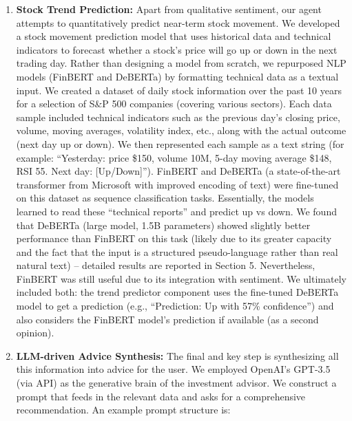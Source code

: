 \documentclass{scrartcl}
\begin{document}
\begin{enumerate}
\noindent
Table~\ref{tab:sentiment_model_comparison} shows a side-by-side comparison of sentiment classifications across individual models and the final ensemble result. This comparison emphasizes how the ensemble strategy corrects edge cases where single models may fail — for example, correctly marking the Amazon expansion as Positive despite FinBERT's Neutral prediction.

This example illustrates several key takeaways:
\begin{itemize}
    \item FinBERT typically excels in domain-specific sentiment.
    \item RoBERTa offers general sentiment understanding but may under- or overestimate tone.
    \item The ensemble aggregates model outputs to yield a balanced and more reliable interpretation.
\end{itemize}

    \item \textbf{Stock Trend Prediction:} Apart from qualitative sentiment, our agent attempts to quantitatively predict near-term stock movement. We developed a stock movement prediction model that uses historical data and technical indicators to forecast whether a stock’s price will go up or down in the next trading day. Rather than designing a model from scratch, we repurposed NLP models (FinBERT and DeBERTa) by formatting technical data as a textual input. We created a dataset of daily stock information over the past 10 years for a selection of S\&P 500 companies (covering various sectors). Each data sample included technical indicators such as the previous day’s closing price, volume, moving averages, volatility index, etc., along with the actual outcome (next day up or down). We then represented each sample as a text string (for example: “Yesterday: price \$150, volume 10M, 5-day moving average \$148, RSI 55. Next day: [Up/Down]”). FinBERT and DeBERTa (a state-of-the-art transformer from Microsoft with improved encoding of text) were fine-tuned on this dataset as sequence classification tasks. Essentially, the models learned to read these “technical reports” and predict up vs down. We found that DeBERTa (large model, 1.5B parameters) showed slightly better performance than FinBERT on this task (likely due to its greater capacity and the fact that the input is a structured pseudo-language rather than real natural text) – detailed results are reported in Section 5. Nevertheless, FinBERT was still useful due to its integration with sentiment. We ultimately included both: the trend predictor component uses the fine-tuned DeBERTa model to get a prediction (e.g., “Prediction: Up with 57\% confidence”) and also considers the FinBERT model’s prediction if available (as a second opinion).
    \item \textbf{LLM-driven Advice Synthesis:} The final and key step is synthesizing all this information into advice for the user. We employed OpenAI’s GPT-3.5 (via API) as the generative brain of the investment advisor. We construct a prompt that feeds in the relevant data and asks for a comprehensive recommendation. An example prompt structure is: 
\end{enumerate}
\end{document}
